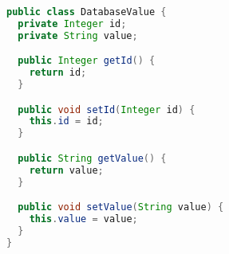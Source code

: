
\begin{lstlisting}[language=Java, caption={Example of object loaded from database}, label={code:model}]
public class DatabaseValue {
  private Integer id;
  private String value;

  public Integer getId() {
    return id;
  }

  public void setId(Integer id) {
    this.id = id;
  }

  public String getValue() {
    return value;
  }

  public void setValue(String value) {
    this.value = value;
  }
}
\end{lstlisting}
